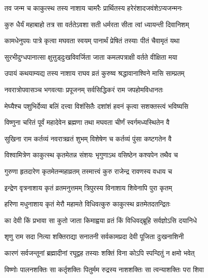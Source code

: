 \twolineshloka
{तव जन्म च काकुत्स्थ तस्य नाशाय चामरैः}
{प्रार्थितस्य हरेरंशादजवंशेऽप्यजन्मनः}%

\twolineshloka
{कुरु धैर्यं महाबाहो तत्र सा वर्ततेऽवशा}
{सती धर्मरता सीता त्वां ध्यायन्ती दिवानिशम्}%

\twolineshloka
{कामधेनुपयः पात्रे कृत्वा मघवता स्वयम्}
{पानार्थं प्रेषितं तस्याः पीतं चैवामृतं यथा}%

\twolineshloka
{सुरभीदुग्धपानात्सा क्षुत्तुड्‌दुःखविवर्जिता}
{जाता कमलपत्राक्षी वर्तते वीक्षिता मया}%

\twolineshloka
{उपायं कथयाम्यद्य तस्य नाशाय राघव}
{व्रतं कुरुष्व श्रद्धावानाश्विने मासि साम्प्रतम्}%

\twolineshloka
{नवरात्रोपवासञ्च भगवत्याः प्रपूजनम्}
{सर्वसिद्धिकरं राम जपहोमविधानतः}%

\twolineshloka
{मेघ्यैश्च पशुभिर्देव्या बलिं दत्त्वा विशंसितैः}
{दशांशं हवनं कृत्वा सशक्तस्त्वं भविष्यसि}%

\twolineshloka
{विष्णुना चरितं पूर्वं महादेवेन ब्रह्मणा}
{तथा मघवता चीर्णं स्वर्गमध्यस्थितेन वै}%

\twolineshloka
{सुखिना राम कर्तव्यं नवरात्रव्रतं शुभम्}
{विशेषेण च कर्तव्यं पुंसा कष्टगतेन वै}%

\twolineshloka
{विश्वामित्रेण काकुत्स्थ कृतमेतन्न संशयः}
{भृगुणाऽथ वसिष्ठेन कश्यपेन तथैव च}%

\twolineshloka
{गुरुणा हृतदारेण कृतमेतन्महाव्रतम्}
{तस्मात्त्वं कुरु राजेन्द्र रावणस्य वधाय च}%

\twolineshloka
{इन्द्रेण वृत्रनाशाय कृतं व्रतमनुत्तमम्}
{त्रिपुरस्य विनाशाय शिवेनापि पुरा कृतम्}%

\twolineshloka
{हरिणा मधुनाशाय कृतं मेरौ महामते}
{विधिवत्कुरु काकुत्स्थ व्रतमेतदतन्द्रितः}%



\twolineshloka
{का देवी किं प्रभावा सा कुतो जाता किमाह्वया}
{व्रतं किं विधिवद्‌ब्रूहि सर्वज्ञोऽसि दयानिधे}%



\twolineshloka
{शृणु राम सदा नित्या शक्तिराद्या सनातनी}
{सर्वकामप्रदा देवी पूजिता दुःखनाशिनी}%

\twolineshloka
{कारणं सर्वजन्तूनां ब्रह्मादीनां रघूद्वह}
{तस्याः शक्तिं विना कोऽपि स्पन्दितुं न क्षमो भवेत्}%

\twolineshloka
{विष्णोः पालनशक्तिः सा कर्तृशक्तिः पितुर्मम}
{रुद्रस्य नाशशक्तिः सा त्वन्याशक्तिः परा शिवा}%

